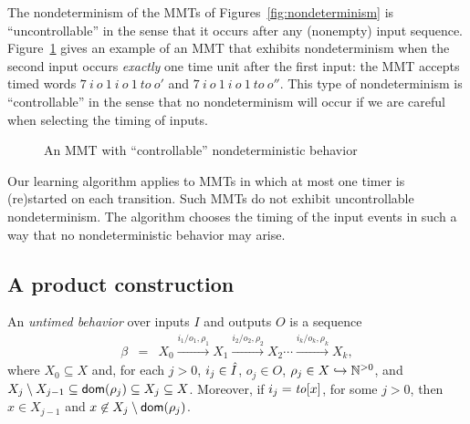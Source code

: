 \fi
%
The nondeterminism of the MMTs of Figures~\ref{fig:nondeterminism} 
is ``uncontrollable'' in the
sense that it occurs after any (nonempty) input sequence.
Figure~\ref{fig:nondeterminism3} gives an example of an MMT that exhibits nondeterminism when the second input occurs \emph{exactly} one time unit after the first input: the MMT accepts timed words
$7 ~ i ~ o ~ 1 ~ i ~ o ~ 1 ~ \mathit{to} ~ o'$ and $7 ~ i ~ o ~ 1 ~ i ~ o ~ 1 ~ \mathit{to} ~ o''$.
This type of nondeterminism is ``controllable'' in the sense that no nondeterminism will occur if we are careful
when selecting the timing of inputs.
\begin{figure}[ht]
\begin{center}
\caption{An MMT with ``controllable'' nondeterministic behavior}
\label{fig:nondeterminism3}
\end{center}
\end{figure}
Our learning algorithm applies to MMTs in which at most one timer is (re)started on each transition. Such MMTs do not
exhibit uncontrollable nondeterminism. The algorithm chooses the timing of the input events in such a way that no
nondeterministic behavior may arise.

\subsection{A product construction}
An \emph{untimed behavior} over inputs $I$ and outputs $O$ is a sequence 
\begin{eqnarray*}
\beta & = & X_0 \xrightarrow{i_1/o_1, \rho_1} X_1  \xrightarrow{i_2/o_2, \rho_2} X_2 \cdots \xrightarrow{i_k/o_k, \rho_k} X_{k},
\end{eqnarray*}
where $X_0 \subseteq X$ and, for each $j>0$,  $i_j \in \hat{I}$, $o_j \in O$, $\rho_j \in X \hookrightarrow {\mathbb N}^{>0}$, and
 $X_j \setminus X_{j-1}  \subseteq {\textsf{dom}}(\rho_j) \subseteq X_j \subseteq X$.
Moreover, if $i_j = \mathit{to}[x]$, for some $j>0$, then $x \in X_{j-1}$ and $x \not\in X_j \setminus {\textsf{dom}}(\rho_j)$.

